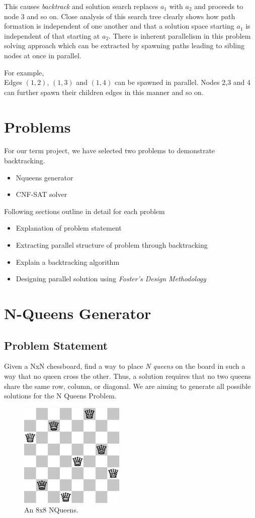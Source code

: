 \documentclass[a4paper]{article}
\begin{document}
This causes \emph{backtrack} and solution search replaces $a_{1}$ with $a_{2}$ and proceeds to node 3 and so on. Close analysis of this search tree clearly shows how path formation is independent of one another and that a solution space starting $a_{1}$ is independent of that starting at $a_{2}$. There is inherent parallelism in this problem solving approach which can be extracted by spawning paths leading to sibling nodes at once in parallel.

For example,\\
Edges $(1,2)$, $(1,3)$ and $(1,4)$ can be spawned in parallel. Nodes 2,3 and 4 can further spawn their children edges in this manner and so on.

\section{Problems}
For our term project, we have selected two problems to demonstrate backtracking.
\begin{itemize}
\item{Nqueens generator}
\item{CNF-SAT solver}
\end{itemize}
Following sections outline in detail for each problem
\begin{itemize}
\item{Explanation of problem statement}
\item{Extracting parallel structure of problem through backtracking}
\item{Explain a backtracking algorithm}
\item{Designing parallel solution using \emph{Foster's Design Methodology}}
\end{itemize}

\section{N-Queens Generator}
\subsection*{Problem Statement}
Given a NxN chessboard, find a way to place \emph{N queens} on the board in such a way that no queen cross the other. Thus, a solution requires that no two queens share the same row, column, or diagonal. We are aiming to generate all possible solutions for the N Queens Problem.
\begin{figure}[ht!]
\centering
\includegraphics[width=50mm]{a.png}
\caption{An 8x8 NQueens.\label{overflow}}
\label{fig:nqueens}
\end{figure}
\end{document}
